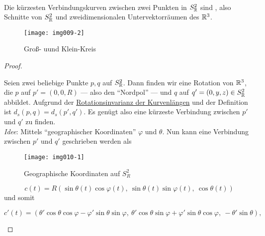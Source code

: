 \begin{lemma}
  \ \\


  \begin{minipage}{.45\textwidth}
    Die kürzesten Verbindungskurven zwischen zwei Punkten in $ S^2_{\mathbb{R}} $ sind , also Schnitte von $ S^2_{\mathbb{R}} $ und zweidimensionalen Untervektorräumen des $ \mathbb{R}^3 $.
  \end{minipage}
  \hfill
  \begin{minipage}{.45\textwidth}
    \begin{figure}[H]
      \label{img009-2}
      \texttt{[image: img009-2]}
      \caption{Groß- uund Klein-Kreis}
    \end{figure}
  \end{minipage}
  \begin{proof}
    \ \\
    \begin{minipage}{.45\textwidth}
      Seien zwei beliebige Punkte $ p,q $ auf $ S^2_{\mathbb{R}} $. Dann finden wir eine Rotation von $ \mathbb{R}^3 $, die $ p $ auf $ p' = (0,0,R) $ --- also den ``Nordpol'' --- und $ q $ auf $ q' = (0,y,z) \in S^2_{\mathbb{R}} $ abbildet. Aufgrund der \hyperref[lemma:kurvenlaengen]{Rotationsinvarianz der Kurvenlängen} und der Definition ist $ d_s(p,q) = d_s(p', q') $. Es genügt also eine kürzeste Verbindung zwischen $ p' $ und $ q' $ zu finden. \\
      \emph{Idee}: Mittels ``geographischer Koordinaten'' $ \varphi $ und $ \theta $. Nun kann eine Verbindung zwischen $ p' $ und $ q' $ geschrieben werden als
    \end{minipage}
    \hfill
    \begin{minipage}{.45\textwidth}
      \begin{figure}[H]
        \label{img010-1}
        \texttt{[image: img010-1]}
        \caption{Geographische Koordinaten auf $ S_R^2 $}
      \end{figure}
    \end{minipage}
    \begin{equation*}
      c(t) = R(\sin\theta(t)\cos\varphi(t), \ \sin\theta(t)\sin\varphi(t), \ \cos\theta(t))
    \end{equation*}
    und somit
    \begin{small}
      \begin{equation*}
        c'(t) = (\theta'\cos\theta\cos\varphi-\varphi'\sin\theta\sin\varphi, \ \theta'\cos\theta\sin\varphi+\varphi'\sin\theta\cos\varphi, \ -\theta'\sin\theta)\text{,}

\end{equation*}
\end{small}
\end{proof}
\end{lemma}
